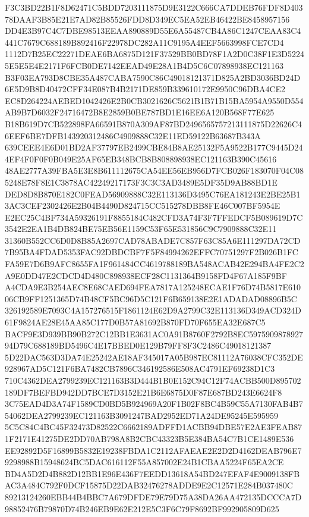 \documentclass[UTF8,fontset=fandol,zihao=-4,a4paper]{ctexart}
\begin{document}
{{F3C3BD22B1F8D62471C5BDD7203111875D9E3122C666CA7DDEB76FDF8D40378DAAF3B85E21E7AD82B85526FDD8D349EC5EA52EB46422BE8458957156
DD4E3B97C4C7DBE98513EEAA890889D55E6A55487CB4A86C1247CEAA83C4441C7679C688189B892416F22978DC282A11C9195A4EEF5663998FCE7CD4
1112D7B25EC22271DEAE6BA6875D121F37529BB0BD78F1A2D0C38F1E3D52245E5E5E4E2171F6FCB0DE7142EEAD49E28A1B4D5C6C07898938EC121163
B3F03EA793D8CBE35A487CABA7590C86C49018121371D825A2BD3036BD24D6E5D9B8D40472CFF34E087B4B2171DE859B339610172E9950C96DBA4CE2
EC8D264224AEBED1042426E2B0CB3021626C5621B1B71B15BA5954A9550D554AB9B7D6032F24716472B8E2859B0BE787BD1E16EE6A120B568F77E625
B18B619D7CB522898FA66591B870A309AF87BD2496565757213111875D22626C46EEF6BE7DFB143920312486C4909888C32E11ED59122B63687B343A
639CEEE4E6D01BD2AF37797EB2499CBE84B8AE25132F5A9522B177C9445D244EF4F0F0F0B049E25AF65EB348BCB8B808898938EC121163B390C45616
48AE2777A39FBA5E3E8B611112675CA54EE56EB956D7FCB026F183070F04C085248E78F8E1C3878AC42249217173F3C3C3AD3489E5DF35D9AB88BD1E
DED8D8B870E182C0FEAD56909888C32E113136D3495C76EA181243E2BE25B13AC3CEF2302426E2B04B4490D824715CC515278DBB8FE46C007BF5954E
E2EC25C4BF734A59326191F8855184C482CFD3A74F3F7FFEDCF5B089619D7C3542E2EA1B4DB824BE75EB56E1159C53F65E531856C9C7909888C32E11
31360B552CC6D0D8B85A2697CAD78ABADE7C857F63C85A6E111297DA72CD7B95BA4FDAD5353FAC92DBDCBF7F5F84994262EFFC70751297F2B026B1FC
FA59E7D6B9AFC8655FA1F961484CC4619788189BA548ACAB42E294BA4FE2C2A9E0DD47E2CDCD4D480C898938ECF28C1131364B9158FD4F67A185F9BF
A4CDA9E3B254AEC8E68CAED694FEA7817A125248ECAE1F76D74B5817E61006CB9FF1251365D74B48CF5BC96D5C121F6B659138E2E1ADADAD08896B5C
326192589E7093C4A157276515F1861124E62D9A2799C32E113136D349ACD324D61F9824AE28E45AA85C177D0B57A81692B870FD70F655EA32E687C5
BACF9E3D939BB90B272C12BB1E3631AC0A91B8760F2792B8EC597590987892794D79C688189BD5496C4E17BBED0E129B79FF8F3C2486C49018121387
5D22DAC563D3DA74E25242AE18AF345017A05B987EC81112A76038CFC352DE928967AD5C121F6BA7482CB7896C346192586E508AC4791EF69238D1C3
710C4362DEA2799239EC121163B3D444B1B0E152C94C12F74ACBB500D895702189DF7BEFBD942DD7BCE7D3152E21B6E6875D0F87E687BD243E6624F8
3C75EAD4D3A74F1589CD0BD5B924969A20F1B02F8BC4B59C55A7130FAB4B754062DEA2799239EC121163B3091247BAD2952ED71A24DE95245E595959
5C5C84C4BC45F32473D82522C6662189ADFFD1ACBB94DBE57E2AE3FEAB871F2171E41275DE2DD70AB798A8B2CBC43323B5E384BA54C7B1CE1489E536
EE92892D5F16899B5832E19238FBDA1C2112AFAEAE2E2D2D4162DEAB796E79298988B15948624BC5DAC616112F55A857002E24B1CBAA5224F65EA2CE
BD4A5D2D4B882D12BB1E96E436F7EEDD13618A54BD247EFAF4E9009138FBAC3A484C792F0DCF15875D22DAB32476278ADDE9E2C12571E284B037480C
89213124260EBB44B4BBC7A679DFDE79E79D75A38DA26AA472135DCCCA7D98852476B79870D74B246EB9E62E212E5C3F6C79F8692BF992905809D625
}}
\end{document}
